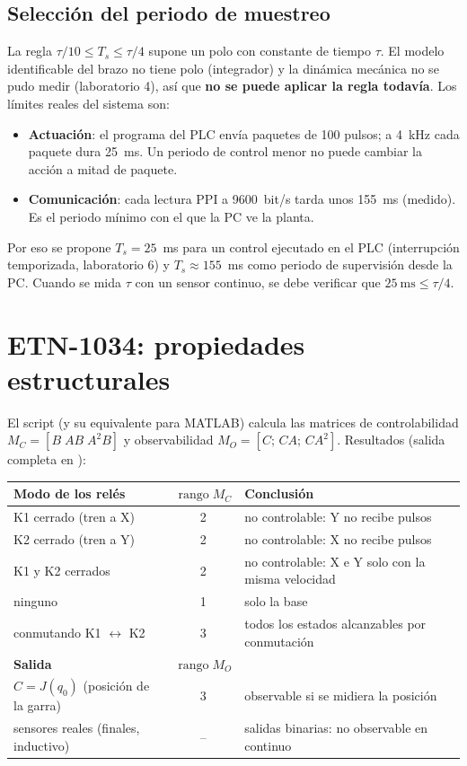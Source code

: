 \documentclass[a4paper,11pt]{article}
\begin{document}
\subsection{Selección del periodo de muestreo}
La regla $\tau/10 \le T_s \le \tau/4$ supone un polo con constante de tiempo $\tau$. El modelo identificable del brazo no tiene polo (integrador) y la dinámica mecánica no se pudo medir (laboratorio 4), así que \textbf{no se puede aplicar la regla todavía}. Los límites reales del sistema son:
\begin{itemize}
\item \textbf{Actuación}: el programa del PLC envía paquetes de 100 pulsos; a 4~kHz cada paquete dura 25~ms. Un periodo de control menor no puede cambiar la acción a mitad de paquete.
\item \textbf{Comunicación}: cada lectura PPI a 9600~bit/s tarda unos 155~ms (medido). Es el periodo mínimo con el que la PC ve la planta.
\end{itemize}
Por eso se propone $T_s = 25$~ms para un control ejecutado en el PLC (interrupción temporizada, laboratorio 6) y $T_s \approx 155$~ms como periodo de supervisión desde la PC. Cuando se mida $\tau$ con un sensor continuo, se debe verificar que $25~\text{ms} \le \tau/4$.

\section{ETN-1034: propiedades estructurales}
El script  (y su equivalente  para MATLAB) calcula las matrices de controlabilidad $M_C = [B\;AB\;A^2B]$ y observabilidad $M_O = [C;\,CA;\,CA^2]$. Resultados (salida completa en ):

\begin{center}\small
\begin{tabular}{l c l}
\toprule
\textbf{Modo de los relés} & $\operatorname{rango} M_C$ & \textbf{Conclusión}\\
\midrule
K1 cerrado (tren a X) & 2 & no controlable: Y no recibe pulsos\\
K2 cerrado (tren a Y) & 2 & no controlable: X no recibe pulsos\\
K1 y K2 cerrados & 2 & no controlable: X e Y solo con la misma velocidad\\
ninguno & 1 & solo la base\\
conmutando K1 $\leftrightarrow$ K2 & 3 & todos los estados alcanzables por conmutación\\
\midrule
\textbf{Salida} & $\operatorname{rango} M_O$ & \\
\midrule
$C = J(q_0)$ (posición de la garra) & 3 & observable si se midiera la posición\\
sensores reales (finales, inductivo) & -- & salidas binarias: no observable en continuo\\
\bottomrule
\end{tabular}
\end{center}
\end{document}
